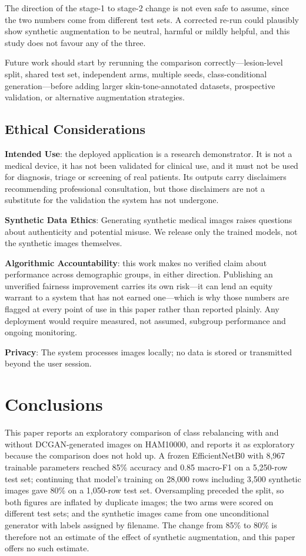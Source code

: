 \documentclass[ai,article,submit,pdftex,moreauthors]{Definitions/mdpi}
\begin{document}
The direction of the stage-1 to stage-2 change is not even safe to assume, since the two numbers come from different test sets. A corrected re-run could plausibly show synthetic augmentation to be neutral, harmful or mildly helpful, and this study does not favour any of the three.

Future work should start by rerunning the comparison correctly---lesion-level split, shared test set, independent arms, multiple seeds, class-conditional generation---before adding larger skin-tone-annotated datasets, prospective validation, or alternative augmentation strategies.

\subsection{Ethical Considerations}

\textbf{Intended Use}: the deployed application is a research demonstrator. It is not a medical device, it has not been validated for clinical use, and it must not be used for diagnosis, triage or screening of real patients. Its outputs carry disclaimers recommending professional consultation, but those disclaimers are not a substitute for the validation the system has not undergone.

\textbf{Synthetic Data Ethics}: Generating synthetic medical images raises questions about authenticity and potential misuse. We release only the trained models, not the synthetic images themselves.

\textbf{Algorithmic Accountability}: this work makes no verified claim about performance across demographic groups, in either direction. Publishing an unverified fairness improvement carries its own risk---it can lend an equity warrant to a system that has not earned one---which is why those numbers are flagged at every point of use in this paper rather than reported plainly. Any deployment would require measured, not assumed, subgroup performance and ongoing monitoring.

\textbf{Privacy}: The system processes images locally; no data is stored or transmitted beyond the user session.

\section{Conclusions}

This paper reports an exploratory comparison of class rebalancing with and without DCGAN-generated images on HAM10000, and reports it as exploratory because the comparison does not hold up. A frozen EfficientNetB0 with 8,967 trainable parameters reached 85\% accuracy and 0.85 macro-F1 on a 5,250-row test set; continuing that model's training on 28,000 rows including 3,500 synthetic images gave 80\% on a 1,050-row test set. Oversampling preceded the split, so both figures are inflated by duplicate images; the two arms were scored on different test sets; and the synthetic images came from one unconditional generator with labels assigned by filename. The change from 85\% to 80\% is therefore not an estimate of the effect of synthetic augmentation, and this paper offers no such estimate.
\end{document}
